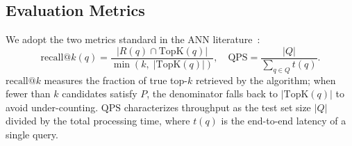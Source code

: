 
\subsection{Evaluation Metrics}
\label{ssec:metrics}

We adopt the two metrics standard in the ANN literature~\cite{ANNBenchmarks2020}:
\begin{equation}
    \mathrm{recall}@k(q) = \frac{|R(q) \cap \mathrm{TopK}(q)|}{\min(k,\; |\mathrm{TopK}(q)|)}, \quad
    \mathrm{QPS} = \frac{|Q|}{\sum_{q \in Q} t(q)}.
\end{equation}
$\mathrm{recall}@k$ measures the fraction of true top-$k$ retrieved by the algorithm; when fewer than $k$ candidates satisfy $P$, the denominator falls back to $|\mathrm{TopK}(q)|$ to avoid under-counting. $\mathrm{QPS}$ characterizes throughput as the test set size $|Q|$ divided by the total processing time, where $t(q)$ is the end-to-end latency of a single query.